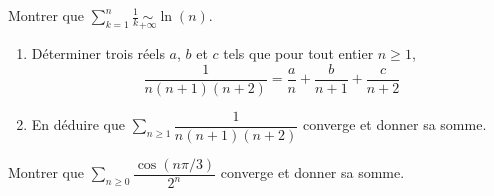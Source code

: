 \documentclass[twoside,a4paper,french,10pt]{VcCours}
\begin{document}
\medskip

\begin{Exercice}
Montrer que $\sum_{k=1}^n \frac{1}{k} \underset{+ \infty}{\sim} \ln(n)$.
\end{Exercice}

\begin{Exercice}
\begin{enumerate}
\item Déterminer trois réels $a$, $b$ et $c$ tels que pour tout entier $n \geq 1$,
$$ \frac{1}{n(n+1)(n+2)} = \frac{a}{n} + \frac{b}{n+1} + \frac{c}{n+2}$$
\item En déduire que $\sum_{n \geq 1} \dfrac{1}{n(n+1)(n+2)}$ converge et donner sa somme.
\end{enumerate}
\end{Exercice}

\begin{Exercice}
Montrer que $\sum_{n \geq 0} \dfrac{\cos(n \pi/3)}{2^n}$ converge et donner sa somme.
\end{Exercice}
\end{document}
